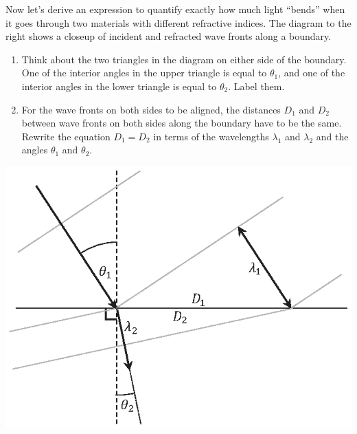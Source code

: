 \begin{minipage}{0.44\textwidth}

Now let's derive an expression to quantify exactly how much light ``bends'' when it goes through two materials with different refractive indices.  The diagram to the right shows a closeup of incident and refracted wave fronts along a boundary.

\begin{enumerate}[labparts]

\item Think about the two triangles in the diagram on either side of the boundary.  One of the interior angles in the upper triangle is equal to $\theta_1$, and one of the interior angles in the lower triangle is equal to $\theta_2$.  Label them.

\item For the wave fronts on both sides to be aligned, the distances $D_1$ and $D_2$ between wave fronts on both sides along the boundary have to be the same.  Rewrite the equation $D_1 = D_2$ in terms of the wavelengths $\lambda_1$ and $\lambda_2$ and the angles $\theta_1$ and $\theta_2$.
\answerspace{0.7in}
\end{enumerate}
\end{minipage}
\begin{minipage}{0.55\textwidth}
\begin{flushright}
\vspace{-0.4in}
\includegraphics{deriving_snells_law/deriving_snell.eps}
\end{flushright}
\end{minipage}

